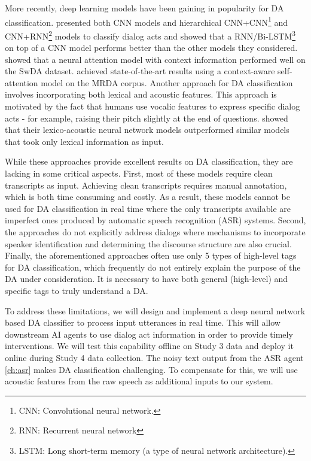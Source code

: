 More recently, deep learning models have been gaining in popularity for DA
classification. \citet{Liu.ea:2017} presented both CNN models and hierarchical
CNN+CNN\footnote{CNN: Convolutional neural network.} and CNN+RNN\footnote{RNN:
Recurrent neural network} models to classify dialog acts and showed that a
RNN/Bi-LSTM\footnote{LSTM: Long short-term memory (a type of neural network
architecture).} on top of a CNN model performs better than the other models
they considered.  \citet{Shen.ea:2016} showed that a neural attention model
with context information performed well on the SwDA dataset.
\citet{Raheja.ea:2019} achieved state-of-the-art results using a context-aware
self-attention model on the MRDA corpus. Another approach for DA classification
involves incorporating both lexical and acoustic features. This approach is
motivated by the fact that humans use vocalic features to express specific
dialog acts - for example, raising their pitch slightly at the end
of questions. \citet{Ortega.ea:2018} showed that their lexico-acoustic neural
network models outperformed similar models that took only lexical information
as input.

While these approaches provide excellent results on DA classification, they are
lacking in some critical aspects.
First, most of these models require clean
transcripts as input. Achieving clean transcripts requires manual annotation,
which is both time consuming and costly. As a result, these models cannot be
used for DA classification in real time where the only transcripts available
are imperfect ones produced by automatic speech recognition (ASR) systems.
Second, the approaches do not explicitly address dialogs where mechanisms to
incorporate speaker identification and determining the discourse structure are
also crucial.
Finally, the aforementioned approaches often use only 5 types of high-level
tags for DA classification, which frequently do not entirely explain the
purpose of the DA under consideration. It is necessary to have both general
(high-level) and specific tags to truly understand a DA.

To address these limitations, we will design and implement a deep neural
network based DA classifier to process input utterances in real time. This will
allow downstream AI agents to use dialog act information in order to provide
timely interventions. We will test this capability offline on Study 3 data and
deploy it online during Study 4 data collection.  The noisy text output from
the ASR agent \autoref{ch:asr} makes DA classification challenging. To
compensate for this, we will use acoustic features from the raw speech as
additional inputs to our system.

